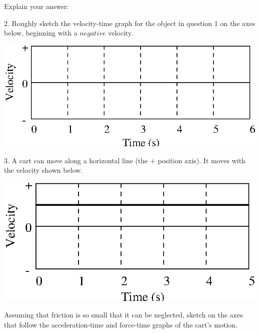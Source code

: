 Explain your answer:
\vspace{10mm}

2. Roughly sketch the velocity-time graph for the object in question 1 on the
axes below, beginning with a $negative$ velocity.

\vspace{0.3cm}
{\par\centering \includegraphics{force1/force1_fig7.eps} \par}
\vspace{0.3cm}

3. A cart can move along a horizontal line (the + position axis). It moves with
the velocity shown below.

\vspace{0.3cm}
{\par\centering \includegraphics{force1/force1_fig8.eps} \par}
\vspace{0.3cm}

\pagebreak[2]
Assuming that friction is so small that it can be neglected, sketch on the axes
that follow the acceleration-time and force-time graphs of the cart's motion.

